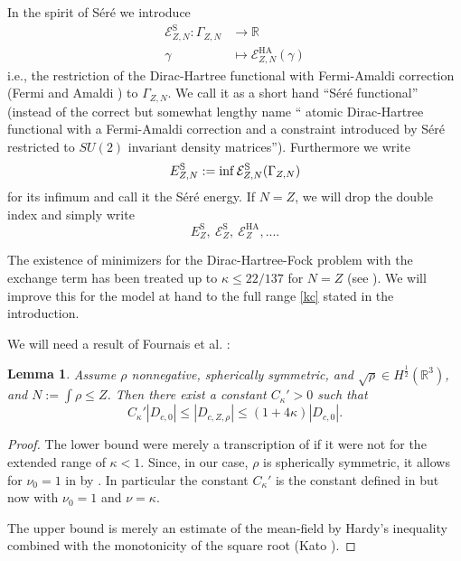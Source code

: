 \documentclass[a4paper]{amsart}
\newtheorem{lemma}{Lemma}
\def\cE{{\mathcal E}}
\def\rz{\mathbb{R}} %
\begin{document}
  In the spirit of S\'er\'e \cite{Sere2023} we introduce
\begin{equation}
  \begin{split}
  \cE_{Z,N}^\mathrm{S}: \Gamma_{Z,N}&\to \rz\\
  \gamma&\mapsto\cE^\mathrm{HA}_{Z,N}(\gamma)
  \end{split}
\end{equation}
i.e., the restriction of the Dirac-Hartree functional with
Fermi-Amaldi correction (Fermi and Amaldi \cite{FermiAmaldi1934}) to
$\Gamma_{Z,N}$. We call it as a short hand ``S\'er\'e functional''
(instead of the correct but somewhat lengthy name ``
atomic Dirac-Hartree functional with a Fermi-Amaldi correction and a
constraint introduced by S\'er\'e restricted to $SU(2)$ invariant
density matrices''). Furthermore we write
\begin{equation}
  \label{eq:min}
  E^{\rm S}_{Z,N}:=\inf \cE^\mathrm{S}_{Z,N}(\Gamma_{Z,N})
\end{equation}
for its infimum and call it the S\'er\'e energy. If $N=Z$, we will
drop the double index and simply write
\begin{equation}
  \label{eq:simple}
  E^\mathrm{S}_Z,\ \cE^\mathrm{S}_Z,\ \cE^\mathrm{HA}_Z,....
\end{equation}
  
The existence of minimizers for the Dirac-Hartree-Fock problem with
the exchange term has been treated \cite[Theorem 1.2]{Sere2023} up to
$\kappa\leq 22/137$ for $N=Z$ (see \cite[Remark
1.4]{Sere2023}). We will improve this for the model at hand to the
full range \eqref{kc} stated in the introduction.
  
We will need a result of Fournais et al. \cite[Theorem
4]{Fournaisetal2020}:
\begin{lemma}
  \label{lem:DF-ope}
  Assume $\rho$ nonnegative, spherically symmetric, and
  $\sqrt\rho\in H^\frac12(\rz^3)$, and $N:=\int\rho\leq Z$. Then there
  exist a constant $C_\kappa'>0$ such that
  \begin{equation}
    \label{2.15}
    C_\kappa'|D_{c,0}|\leq |D_{c,Z,\rho}|\leq (1+4\kappa)|D_{c,0}|.
  \end{equation}
\end{lemma}
\begin{proof}
  The lower bound were merely a transcription of \cite[Theorem
  4]{Fournaisetal2020} if it were not for the extended range of
  $\kappa<1$. Since, in our case, $\rho$ is spherically symmetric, it
  allows for $\nu_0=1$ in \cite[Equation (14)]{Fournaisetal2020} by
  \cite[Lemma 2]{Fournaisetal2020}. In particular the constant
  $C_\kappa'$ is the constant defined in \cite[Equation
  (19)]{Fournaisetal2020} but now with $\nu_0=1$ and $\nu=\kappa$.

  The upper bound is merely an estimate of the mean-field by Hardy's
  inequality combined with the monotonicity of the square root (Kato
  \cite[Theorem 2]{Kato1952}).
\end{proof}
\end{document}
